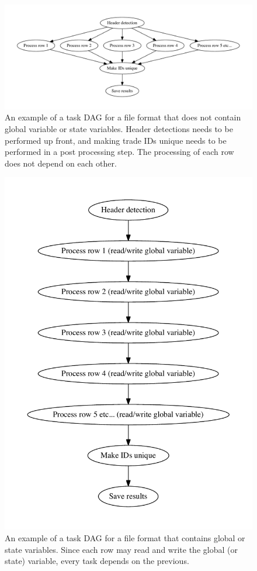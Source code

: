 \begin{figure}[ht]
  \centering
  \includegraphics[width=120mm]{figures/embarrassing_file_format.pdf}
  \caption[Task DAG for a file format that does not contain global or state variables.]{An example of a task DAG for a file format that does not contain global variable or state variables. Header detections needs
  to be performed up front, and making trade IDs unique needs to be performed in a post processing step. The processing of each row does not depend on each other.}
  \label{fig:embarrassing_dag}
\end{figure}

\begin{figure}[ht]
  \centering
  \includegraphics[width=120mm]{figures/global_variable_file_format.pdf}
  \caption[Task DAG for a file format that contains global or state variables.]{An example of a task DAG for a file format that contains global or state variables. Since each row may read and
  write the global (or state) variable, every task depends on the previous.}
  \label{fig:global_dag}
\end{figure}

